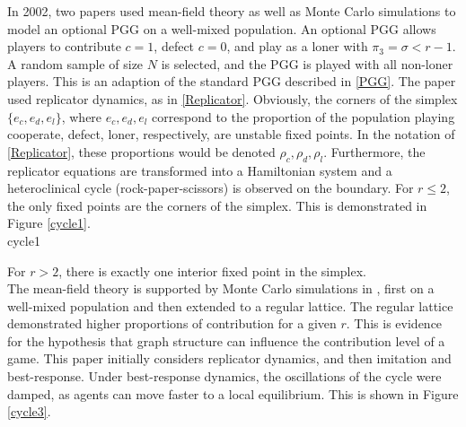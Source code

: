  In 2002, two papers \cite{RN47, RN67} used mean-field theory as well as Monte Carlo simulations to model an optional PGG on a well-mixed population. An optional PGG allows players to contribute $c=1$, defect $c=0$, and play as a loner with $\pi_{3} = \sigma<r-1$. A random sample of size $N$ is selected, and the PGG is played with all non-loner players. This is an adaption of the standard PGG described in \ref{PGG}. The paper \cite{RN47} used replicator dynamics, as in \ref{Replicator}. Obviously, the corners of the simplex $\{e_c, e_d, e_l\}$, where $e_c, e_d, e_l$ correspond to the proportion of the population playing cooperate, defect, loner, respectively,  are unstable fixed points. In the notation of \eqref{Replicator}, these proportions would be denoted $\rho_c,\rho_d,\rho_l$. Furthermore, the replicator equations are transformed into a Hamiltonian system and a heteroclinical cycle (rock-paper-scissors) is observed on the boundary. For $r\leq 2$, the only fixed points are the corners of the simplex. This is demonstrated in Figure \ref{cycle1}. \\
  {cycle1}
 
 
 For $r>2$, there is exactly one interior fixed point in the simplex. \\
 \FloatBarrier
 \FloatBarrier
 The mean-field theory is supported by Monte Carlo simulations in \cite{RN67}, first on a well-mixed population and then extended to a regular lattice. The regular lattice demonstrated higher proportions of contribution for a given $r$. This is evidence for the hypothesis that graph structure can influence the contribution level of a game. This paper initially considers replicator dynamics, and then imitation and best-response. Under best-response dynamics, the oscillations of the cycle were damped, as agents can move faster to a local equilibrium. This is shown in Figure \ref{cycle3}. \\
 
